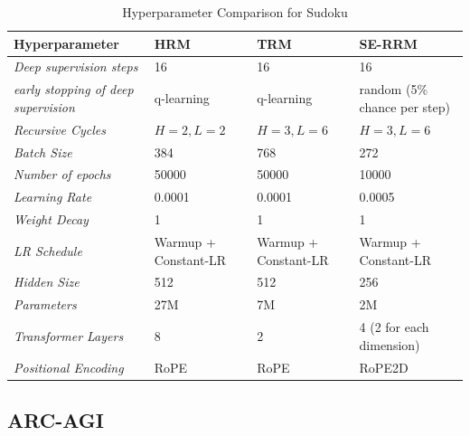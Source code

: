 \documentclass{article}
\theoremstyle{plain}
\theoremstyle{definition}
\theoremstyle{remark}
\begin{document}
\begin{table}[H]
\centering
\caption{Hyperparameter Comparison for Sudoku}
\label{tab:hyperparams_sudoku}
\begin{tabular}{@{}llll@{}}
\toprule
\textbf{Hyperparameter} & \textbf{HRM} & \textbf{TRM}  & \textbf{SE-RRM}\\ 

\midrule
\textit{Deep supervision steps} & 16 & 16  & 16 \\
\textit{early stopping of deep supervision} & q-learning & q-learning  & random (5\% chance per step) \\
\textit{Recursive Cycles} & $H=2, L=2$ & $H=3, L=6$  & $H=3, L=6$  \\
\textit{Batch Size} & 384 & 768  & 272 \\
\textit{Number of epochs} & 50000 & 50000  & 10000 \\
\textit{Learning Rate} & 0.0001 & 0.0001  & 0.0005 \\
\textit{Weight Decay} & 1 & 1 & 1 \\
\textit{LR Schedule} & Warmup + Constant-LR & Warmup + Constant-LR & Warmup + Constant-LR \\
\textit{Hidden Size} & 512 & 512 & 256 \\
\textit{Parameters} & 27M & 7M & 2M \\
\textit{Transformer Layers} & 8 & 2 & 4 (2 for each dimension) \\ 
\textit{Positional Encoding} & RoPE &RoPE & RoPE2D \\ 
\bottomrule
\end{tabular}
\end{table}

\subsection{ARC-AGI}
\end{document}
